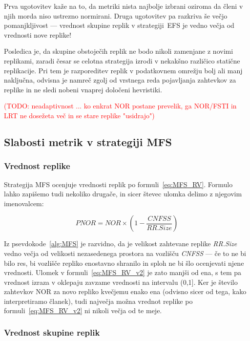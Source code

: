 \documentclass[a4paper, 12pt]{book}
\newcommand{\TODO}[1]{\textcolor{red}{(TODO: #1)}}
\begin{document}
Prva ugotovitev kaže na to, da metriki nista najbolje izbrani oziroma da
členi v njih morda niso ustrezno normirani. Druga ugotovitev pa razkriva še
večjo pomanjkljivost --- vrednost skupine replik v strategiji~EFS je vedno
večja od vrednosti nove replike!

Posledica je, da skupine obstoječih replik ne bodo nikoli zamenjane z novimi
replikami, zaradi česar se celotna strategija izrodi v nekakšno različico
statične replikacije. Pri tem je razporeditev replik v podatkovnem
omrežju bolj ali manj naključna, odvisna je namreč zgolj od
vrstnega reda pojavljanja zahtevkov za replike in ne sledi nobeni vnaprej
določeni hevristiki.


\TODO{neadaptivnost ... ko enkrat NOR postane prevelik, ga NOR/FSTI in LRT
ne dosežeta več in se stare replike "usidrajo"}

\subsection{Slabosti metrik v strategiji MFS}

\subsubsection{Vrednost replike}

Strategija MFS ocenjuje vrednosti replik po formuli~\eqref{eq:MFS_RV}.
Formulo lahko zapišemo tudi nekoliko drugače, in sicer števec ulomka delimo z
njegovim imenovalcem:

\begin{equation}
  \mathit{PNOR} = \mathit{NOR} \times
                 \left(1 - \frac{\mathit{CNFSS}}{\mathit{ RR.Size}}\right)
  \label{eq:MFS_RV_v2}
\end{equation}

Iz psevdokode~\ref{alg:MFS} je razvidno, da je velikost zahtevane replike
\textit{RR.Size} vedno večja od velikosti nezasedenega prostora na vozlišču
\textit{CNFSS} --- če to ne bi bilo res, bi vozlišče repliko enostavno shranilo
in sploh ne bi šlo ocenjevati njene vrednosti. Ulomek v
formuli~\eqref{eq:MFS_RV_v2} je zato manjši od ena, s tem pa vrednost izraza v
oklepaju zavzame vrednosti na intervalu (0,1].
Ker je število zahtevkov NOR za novo repliko kvečjemu enako
ena (odvisno sicer od tega, kako interpretiramo članek), tudi največja možna
vrednot replike po formuli~\eqref{eq:MFS_RV_v2} ni nikoli večja od te meje.

\subsubsection{Vrednost skupine replik}
\end{document}
